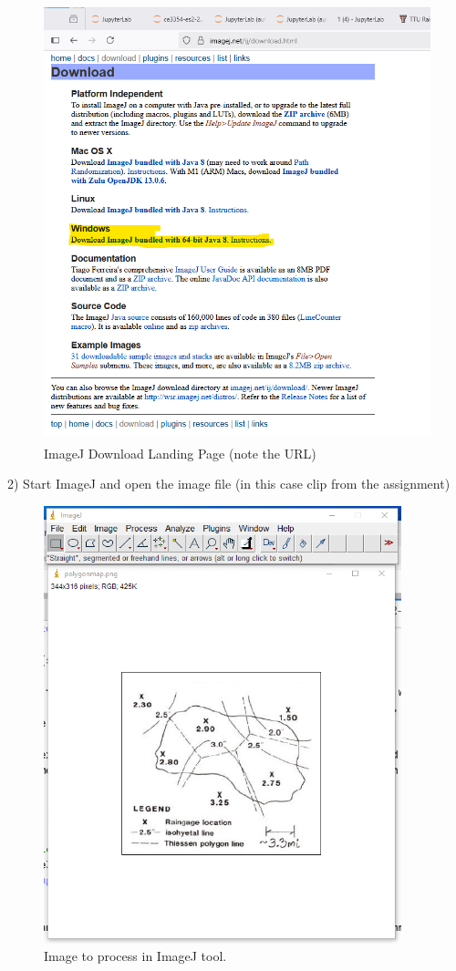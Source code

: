\documentclass[12pt]{article}
\begin{document}
\begin{enumerate}
\begin{figure}[h!] %
   \centering
   \includegraphics[height=5in]{imageJ.png} 
   \caption{ImageJ Download Landing Page (note the URL)}
   \label{fig:imageJ}
\end{figure}

2) Start ImageJ and open the image file (in this case clip from the assignment)

\begin{figure}[h!] %
   \centering
   \includegraphics[height=5in]{polymap2process1.png} 
   \caption{Image to process in ImageJ tool.}
   \label{fig:polymap2process1}
\end{figure}


\end{enumerate}
\end{document}
